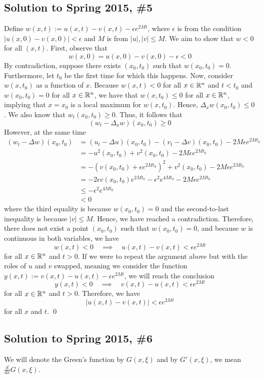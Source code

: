 \subsection*{Solution to Spring 2015, \#5}\label{s155}
Define $w(x,t) := u(x,t) - v(x,t) - \epsilon e^{2Mt}$, where $\epsilon$ is from the condition $ |u(x,0) - v(x,0)| < \epsilon$ and $M$ is from $|u|, |v| \leq M$. We aim to show that $w < 0$ for all $(x,t)$. First, observe that
$$ w(x,0) = u(x,0) - v(x,0) - \epsilon < 0 $$
By contradiction, suppose there exists $(x_0,t_0)$ such that $w(x_0,t_0) = 0$. Furthermore, let $t_0$ be the first time for which this happens. Now, consider $w(x,t_0)$ as a function of $x$. Because $w(x,t) < 0 $ for all $x \in \mathbb{R}^n$ and $t < t_0$ and $w(x_0,t_0) = 0$ for all $x \in \mathbb{R}^n$, we have that $w(x,t_0) \leq 0$ for all $x \in \mathbb{R}^n$, implying that $x = x_0$ is a local maximum for $w(x,t_0)$. Hence, $\Delta_x w(x_0,t_0) \leq 0$. We also know that $w_t(x_0,t_0) \geq 0$. Thus, it follows that
$$ (w_t - \Delta_x w)(x_0,t_0) \geq 0 $$
However, at the same time
\begin{align*}
	(w_t - \Delta w)(x_0,t_0) &= (u_t - \Delta u)(x_0,t_0) - (v_t - \Delta v)(x_0,t_0) - 2M \epsilon e^{2M t_0} \\
	&= -u^2 (x_0,t_0) + v^2(x_0,t_0) - 2M \epsilon e^{2Mt_0} \\
	&= -(v(x_0,t_0) + \epsilon e^{2Mt_0})^2 + v^2(x_0,t_0) - 2M \epsilon e^{2Mt_0} \\
	&= -2 \epsilon v(x_0,t_0) e^{2Mt_0} - \epsilon^2 e^{4Mt_0} - 2M \epsilon e^{2Mt_0} \\
	&\leq -\epsilon^2 e^{4Mt_0} \\
	&< 0
\end{align*}
where the third equality is because $w(x_0,t_0) = 0$ and the second-to-last inequality is because $|v| \leq M$. Hence, we have reached a contradiction. Therefore, there does not exist a point $(x_0,t_0)$ such that $w(x_0,t_0) = 0$, and because $w$ is continuous in both variables, we have
$$ w(x,t) < 0 \quad \implies \quad u(x,t) - v(x,t) < \epsilon e^{2Mt} $$
for all $x \in \mathbb{R}^n$ and $t > 0$. If we were to repeat the argument above but with the roles of $u$ and $v$ swapped, meaning we consider the function $y(x,t) := v(x,t) - u(x,t) - \epsilon e^{2Mt}$, we will reach the conclusion
$$ y(x,t) < 0 \quad \implies \quad v(x,t) - u(x,t) < \epsilon e^{2Mt} $$
for all $x \in \mathbb{R}^n$ and $t >0$. Therefore, we have
$$ |u(x,t) - v(x,t)| < \epsilon e^{2Mt} $$
for all $x$ and $t$.
\hfill\qed

\subsection*{Solution to Spring 2015, \#6}\label{s156}
We will denote the Green's function by $G(x, \xi)$ and by $G'(x, \xi)$, we mean $\frac{d}{dx}G(x, \xi)$.
